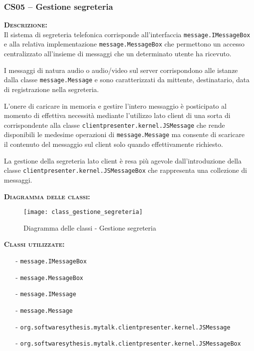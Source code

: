 \subsubsection{CS05 -- Gestione segreteria}
\begin{description}
	\item{\scshape\bfseries Descrizione:}\\
Il sistema di segreteria telefonica corrisponde all'interfaccia \texttt{message.IMessageBox} e alla relativa implementazione \texttt{message.MessageBox} che permettono un accesso centralizzato all'insieme di messaggi che un determinato utente ha ricevuto.

I messaggi di natura audio o audio/video sul server corrispondono alle istanze dalla classe \texttt{message.Message} e sono caratterizzati da mittente, destinatario, data di registrazione nella segreteria.

L'onere di caricare in memoria e gestire l'intero messaggio è posticipato al momento di effettiva necessità mediante l'utilizzo lato client di una sorta di  corrispondente alla classe \texttt{clientpresenter.kernel.JSMessage} che rende disponibili le medesime operazioni di \texttt{message.Message} ma consente di scaricare il contenuto del messaggio sul client solo quando effettivamente richiesto.

La gestione della segreteria lato client è resa più agevole dall'introduzione della classe \texttt{clientpresenter.kernel.JSMessageBox} che rappresenta una collezione di messaggi.

	\item{\scshape\bfseries Diagramma delle classi:}
\begin{figure}[H]
  \centering
  \texttt{[image: class\_gestione\_segreteria]}
  \caption{Diagramma delle classi - Gestione segreteria}\label{fig:gestionesegreteria}
\end{figure}	
	
	\item{\scshape\bfseries Classi utilizzate:}
	\begin{itemize}[noitemsep,nolistsep]
	  \item[-] \texttt{message.IMessageBox}
	  \item[-] \texttt{message.MessageBox}
		\item[-] \texttt{message.IMessage}
	  \item[-] \texttt{message.Message}
	  \item[-] \texttt{org.softwaresythesis.mytalk.clientpresenter.kernel.JSMessage}
	  \item[-] \texttt{org.softwaresythesis.mytalk.clientpresenter.kernel.JSMessageBox}
	\end{itemize}
\end{description}


